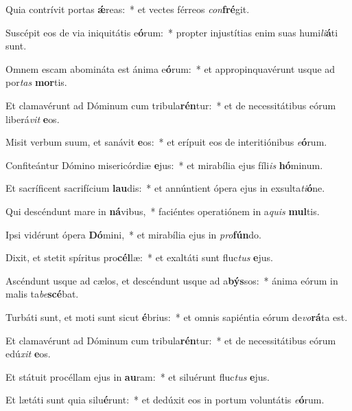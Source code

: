 \item Quia contrívit portas \textbf{ǽ}reas:~* et vectes férreos \textit{con}\textbf{fré}git.
\item Suscépit eos de via iniquitátis e\textbf{ó}rum:~* propter injustítias enim suas humi\textit{li}\textbf{á}ti sunt.
\item Omnem escam abomináta est ánima e\textbf{ó}rum:~* et appropinquavérunt usque ad por\textit{tas} \textbf{mor}tis.
\item Et clamavérunt ad Dóminum cum tribula\textbf{rén}tur:~* et de necessitátibus eórum liberá\textit{vit} \textbf{e}os.
\item Misit verbum suum, et sanávit \textbf{e}os:~* et erípuit eos de interitiónibus \textit{e}\textbf{ó}rum.
\item Confiteántur Dómino misericórdiæ \textbf{e}jus:~* et mirabília ejus fíli\textit{is} \textbf{hó}minum.
\item Et sacríficent sacrifícium \textbf{lau}dis:~* et annúntient ópera ejus in exsulta\textit{ti}\textbf{ó}ne.
\item Qui descéndunt mare in \textbf{ná}vibus,~* faciéntes operatiónem in a\textit{quis} \textbf{mul}tis.
\item Ipsi vidérunt ópera \textbf{Dó}mini,~* et mirabília ejus in \textit{pro}\textbf{fún}do.
\item Dixit, et stetit spíritus pro\textbf{cél}læ:~* et exaltáti sunt fluc\textit{tus} \textbf{e}jus.
\item Ascéndunt usque ad cælos, et descéndunt usque ad a\textbf{býs}sos:~* ánima eórum in malis ta\textit{be}\textbf{scé}bat.
\item Turbáti sunt, et moti sunt sicut \textbf{é}brius:~* et omnis sapiéntia eórum de\textit{vo}\textbf{rá}ta est.
\item Et clamavérunt ad Dóminum cum tribula\textbf{rén}tur:~* et de necessitátibus eórum edú\textit{xit} \textbf{e}os.
\item Et státuit procéllam ejus in \textbf{au}ram:~* et siluérunt fluc\textit{tus} \textbf{e}jus.
\item Et lætáti sunt quia silu\textbf{é}runt:~* et dedúxit eos in portum voluntátis \textit{e}\textbf{ó}rum.
